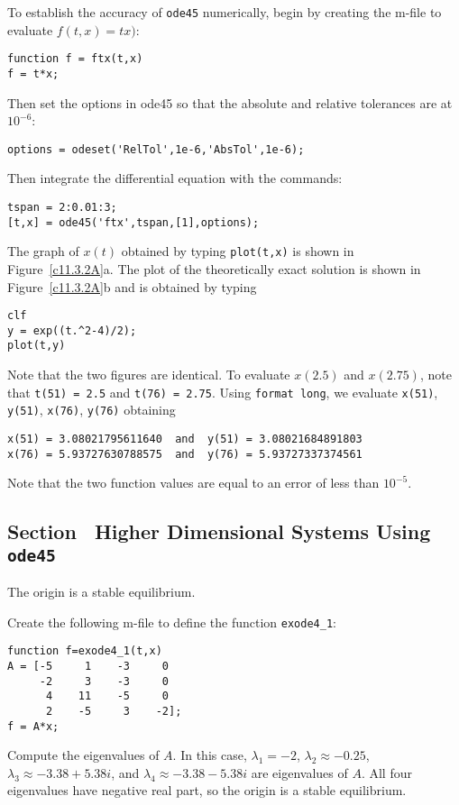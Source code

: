 \documentclass{ximera}
\begin{document}
To establish the accuracy of {\tt ode45} numerically, begin by creating the 
m-file to evaluate $f(t,x)=tx)$:
\begin{verbatim}
function f = ftx(t,x)
f = t*x;
\end{verbatim}
Then set the options in {\sf ode45} so that the absolute and relative
tolerances are at $10^{-6}$:
\begin{verbatim}
options = odeset('RelTol',1e-6,'AbsTol',1e-6);
\end{verbatim}
Then integrate the differential equation with the commands:
\begin{verbatim}
tspan = 2:0.01:3;
[t,x] = ode45('ftx',tspan,[1],options);
\end{verbatim}
The graph of $x(t)$ obtained by typing {\tt plot(t,x)} is shown in
Figure~\ref{c11.3.2A}a.  The plot of the theoretically exact solution
is shown in Figure~\ref{c11.3.2A}b and is obtained by typing
\begin{verbatim}
clf
y = exp((t.^2-4)/2);
plot(t,y)
\end{verbatim}
Note that the two figures are identical.  To evaluate $x(2.5)$ and $x(2.75)$,
note that {\tt t(51) = 2.5} and {\tt t(76) = 2.75}.  Using {\tt format long}, 
we evaluate {\tt x(51)}, {\tt y(51)}, {\tt x(76)}, {\tt y(76)} obtaining
\begin{verbatim}
x(51) = 3.08021795611640  and  y(51) = 3.08021684891803
x(76) = 5.93727630788575  and  y(76) = 5.93727337374561
\end{verbatim}
Note that the two function values are equal to an error of less than 
$10^{-5}$.

\begin{figure}[htb]
     \centerline{%
     }
\end{figure} 



\subsection*{Section~\protect{\ref{S:ode45HD}} Higher Dimensional Systems Using 
{\tt ode45}}

\ans The origin is a stable equilibrium.

\soln Create the following m-file to define the function {\tt exode4\_1}:
\begin{verbatim}
function f=exode4_1(t,x)
A = [-5     1    -3     0
     -2     3    -3     0
      4    11    -5     0
      2    -5     3    -2];
f = A*x;
\end{verbatim}
Compute the eigenvalues of $A$.  In this case, $\lambda_1 = -2$, $\lambda_2
\approx -0.25$, $\lambda_3 \approx -3.38 + 5.38i$, and $\lambda_4 \approx
-3.38 - 5.38i$ are eigenvalues of $A$.  All four eigenvalues have negative
real part, so the origin is a stable equilibrium.
\end{document}
